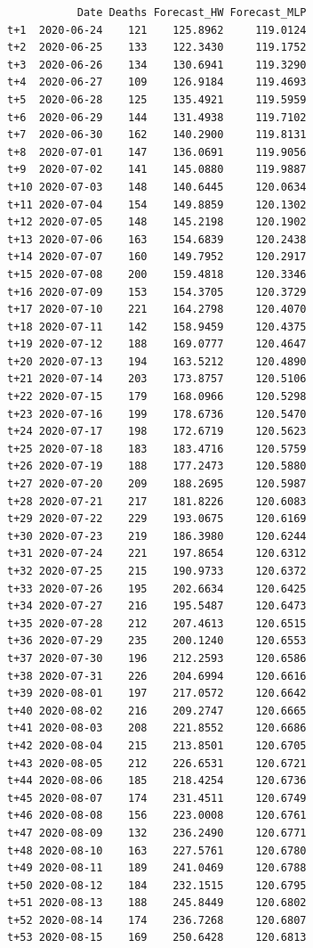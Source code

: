 \documentclass[
  us-letterpaper,
]{scrreprt}
\theoremstyle{plain}
\theoremstyle{definition}
\theoremstyle{plain}
\theoremstyle{definition}
\theoremstyle{remark}
\begin{document}
\begin{table}
{\begin{verbatim}
           Date Deaths Forecast_HW Forecast_MLP
t+1  2020-06-24    121    125.8962     119.0124
t+2  2020-06-25    133    122.3430     119.1752
t+3  2020-06-26    134    130.6941     119.3290
t+4  2020-06-27    109    126.9184     119.4693
t+5  2020-06-28    125    135.4921     119.5959
t+6  2020-06-29    144    131.4938     119.7102
t+7  2020-06-30    162    140.2900     119.8131
t+8  2020-07-01    147    136.0691     119.9056
t+9  2020-07-02    141    145.0880     119.9887
t+10 2020-07-03    148    140.6445     120.0634
t+11 2020-07-04    154    149.8859     120.1302
t+12 2020-07-05    148    145.2198     120.1902
t+13 2020-07-06    163    154.6839     120.2438
t+14 2020-07-07    160    149.7952     120.2917
t+15 2020-07-08    200    159.4818     120.3346
t+16 2020-07-09    153    154.3705     120.3729
t+17 2020-07-10    221    164.2798     120.4070
t+18 2020-07-11    142    158.9459     120.4375
t+19 2020-07-12    188    169.0777     120.4647
t+20 2020-07-13    194    163.5212     120.4890
t+21 2020-07-14    203    173.8757     120.5106
t+22 2020-07-15    179    168.0966     120.5298
t+23 2020-07-16    199    178.6736     120.5470
t+24 2020-07-17    198    172.6719     120.5623
t+25 2020-07-18    183    183.4716     120.5759
t+26 2020-07-19    188    177.2473     120.5880
t+27 2020-07-20    209    188.2695     120.5987
t+28 2020-07-21    217    181.8226     120.6083
t+29 2020-07-22    229    193.0675     120.6169
t+30 2020-07-23    219    186.3980     120.6244
t+31 2020-07-24    221    197.8654     120.6312
t+32 2020-07-25    215    190.9733     120.6372
t+33 2020-07-26    195    202.6634     120.6425
t+34 2020-07-27    216    195.5487     120.6473
t+35 2020-07-28    212    207.4613     120.6515
t+36 2020-07-29    235    200.1240     120.6553
t+37 2020-07-30    196    212.2593     120.6586
t+38 2020-07-31    226    204.6994     120.6616
t+39 2020-08-01    197    217.0572     120.6642
t+40 2020-08-02    216    209.2747     120.6665
t+41 2020-08-03    208    221.8552     120.6686
t+42 2020-08-04    215    213.8501     120.6705
t+43 2020-08-05    212    226.6531     120.6721
t+44 2020-08-06    185    218.4254     120.6736
t+45 2020-08-07    174    231.4511     120.6749
t+46 2020-08-08    156    223.0008     120.6761
t+47 2020-08-09    132    236.2490     120.6771
t+48 2020-08-10    163    227.5761     120.6780
t+49 2020-08-11    189    241.0469     120.6788
t+50 2020-08-12    184    232.1515     120.6795
t+51 2020-08-13    188    245.8449     120.6802
t+52 2020-08-14    174    236.7268     120.6807
t+53 2020-08-15    169    250.6428     120.6813
\end{verbatim}

}

\end{table}%
\end{document}
